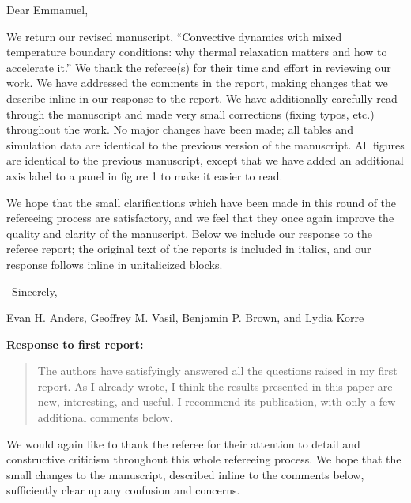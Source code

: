 \documentclass[aps, 11pt, singlecolumn]{revtex4-1} %
\begin{document}
\newenvironment{myquotation}{
\begin{quotation}
\itshape
}{ 
\end{quotation}
}
\noindent
Dear Emmanuel,

\begin{singlespace}

We return our revised manuscript, ``Convective dynamics with mixed temperature boundary conditions: why thermal relaxation matters and how to accelerate it.'' 
We thank the referee(s) for their time and effort in reviewing our work.
We have addressed the comments in the report, making changes that we describe inline in our response to the report.
We have additionally carefully read through the manuscript and made very small corrections (fixing typos, etc.) throughout the work.
No major changes have been made; all tables and simulation data are identical to the previous version of the manuscript.
All figures are identical to the previous manuscript, except that we have added an additional axis label to a panel in figure 1 to make it easier to read.

We hope that the small clarifications which have been made in this round of the refereeing process are satisfactory, and we feel that they once again improve the quality and clarity of the manuscript.
Below we include our response to the referee report; the original text of the reports is included in italics, and our response follows inline in unitalicized blocks.

$\,$\newline
\noindent
Sincerely,

Evan H. Anders, Geoffrey M. Vasil, Benjamin P. Brown, and Lydia Korre



\newpage
\noindent
\Large{\textbf{Response to first report:}}\newline$\,$\newline\indent

\begin{myquotation}
The authors have satisfyingly answered all the questions raised in my first report. 
As I already wrote, I think the results presented in this paper are new, interesting, and useful. 
I recommend its publication, with only a few additional comments below.
\end{myquotation}
We would again like to thank the referee for their attention to detail and constructive criticism throughout this whole refereeing process.
We hope that the small changes to the manuscript, described inline to the comments below, sufficiently clear up any confusion and concerns.


\end{singlespace}
\end{document}
